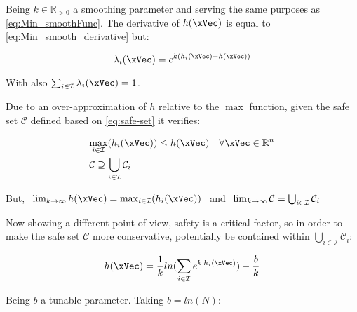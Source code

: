 \begin{description}
    Being \(k \in \mathbb{R}_{>0}\) a smoothing parameter and serving the same purposes as \eqref{eq:Min_smoothFunc}. The derivative of \(h(\xVec)\) is equal to \eqref{eq:Min_smooth_derivative} but:

    \begin{equation}
        \lambda_i(\xVec) = e^{k(h_i(\xVec)-h(\xVec))}
        \label{eq:Max_lambda_smoothFunc}
    \end{equation}

    With also \(\sum_{i \in \mathcal{I}} \lambda_i(\xVec) = 1\). \par
    Due to an over-approximation of \(h\) relative to the \(\max\) function, given the safe set \(\mathcal{C}\) defined based on \eqref{eq:safe-set} it verifies:

    \begin{subequations}
        \begin{align}
            &\underset{i \in \mathcal{I}}{\max} (h_i(\xVec)) \leq h(\xVec) \quad \forall \xVec \in \mathbb{R}^n 
            \label{eq:Union_CBF_Comparation} \\
            &\mathcal{C} \supseteq \bigcup_{i \in \mathcal{I}} \mathcal{C}_i
            \label{eq:Union_SafeSet_Comparation}
        \end{align}
    \end{subequations}

    But, \(\hspace{0.4em} \lim_{k \to \infty} h(\xVec) = {\max}_{i \in \mathcal{I}} (h_i(\xVec)) \hspace{0.4em}\) and \( \hspace{0.4em} \lim_{k \to \infty} \mathcal{C} = \bigcup_{i \in \mathcal{I}} \mathcal{C}_i\) \par

    Now showing a different point of view, safety is a critical factor, so in order to make the safe set \(\mathcal{C}\) more conservative, potentially be contained within \( \bigcup_{i \in \mathcal{I}} \mathcal{C}_i\): 
    
    \begin{equation}
        h(\xVec) = \frac{1}{k}ln(\sum_{i \in \mathcal{I}} e^{k \hspace{0.2em} h_i(\xVec)}) - \frac{b}{k}
        \label{eq:Max_smoothFunc_tighted} \\  
    \end{equation}

    Being  \(b\) a tunable parameter. Taking \(b = ln (N)\):


\end{description}
